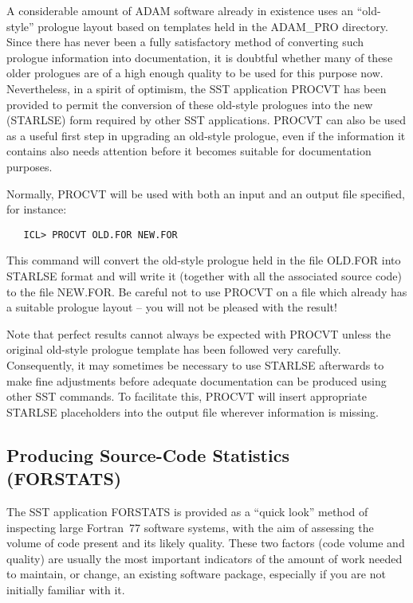 A considerable amount of ADAM software already in existence uses an
``old-style'' prologue layout based on templates held in the ADAM\_PRO
directory.
Since there has never been a fully satisfactory method of converting such
prologue information into documentation, it is doubtful whether many of
these older prologues are of a high enough quality to be used for this
purpose now.
Nevertheless, in a spirit of optimism, the SST application PROCVT has been
provided to permit the conversion of these old-style prologues into the new
(STARLSE) form required by other SST applications.
PROCVT can also be used as a useful first step in upgrading an old-style
prologue, even if the information it contains also needs attention before it
becomes suitable for documentation purposes.

Normally, PROCVT will be used with both an input and an output file
specified, for instance:

\begin{verbatim}
   ICL> PROCVT OLD.FOR NEW.FOR
\end{verbatim}

This command will convert the old-style prologue held in the file OLD.FOR
into STARLSE format and will write it (together with all the associated
source code) to the file NEW.FOR.
Be careful not to use PROCVT on a file which already has a suitable prologue
layout -- you will not be pleased with the result!

Note that perfect results cannot always be expected with PROCVT unless the
original old-style prologue template has been followed very carefully.
Consequently, it may sometimes be necessary to use STARLSE afterwards to
make fine adjustments before adequate documentation can be produced using
other SST commands.
To facilitate this, PROCVT will insert appropriate STARLSE placeholders into
the output file wherever information is missing.


\subsection{Producing Source-Code Statistics (FORSTATS)}

The SST application FORSTATS is provided as a ``quick look'' method of
inspecting large Fortran~77 software systems, with the aim of assessing the
volume of code present and its likely quality.
These two factors (code volume and quality) are usually the most important
indicators of the amount of work needed to maintain, or change, an existing
software package, especially if you are not initially familiar with it.

